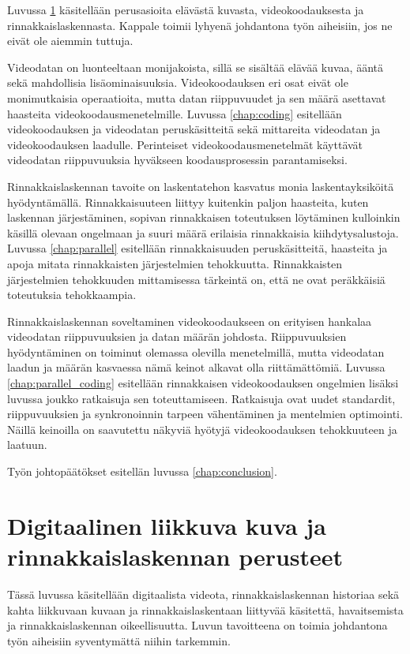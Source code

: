 Luvussa \ref{chap:intro} käsitellään perusasioita elävästä kuvasta,
videokoodauksesta ja rinnakkaislaskennasta. Kappale toimii lyhyenä johdantona
työn aiheisiin, jos ne eivät ole aiemmin tuttuja.

Videodatan on luonteeltaan monijakoista, sillä se sisältää elävää kuvaa, ääntä
sekä mahdollisia lisäominaisuuksia. Videokoodauksen eri osat eivät ole
monimutkaisia operaatioita, mutta datan riippuvuudet ja sen määrä asettavat
haasteita videokoodausmenetelmille. Luvussa \ref{chap:coding} esitellään
videokoodauksen ja videodatan peruskäsitteitä sekä mittareita
videodatan ja videokoodauksen laadulle. Perinteiset videokoodausmenetelmät
käyttävät videodatan riippuvuuksia hyväkseen koodausprosessin parantamiseksi.

Rinnakkaislaskennan tavoite on laskentatehon kasvatus monia laskentayksiköitä
hyödyntämällä. Rinnakkaisuuteen liittyy kuitenkin paljon haasteita, kuten laskennan
järjestäminen, sopivan rinnakkaisen toteutuksen löytäminen kulloinkin käsillä
olevaan ongelmaan ja suuri määrä erilaisia rinnakkaisia kiihdytysalustoja.
Luvussa \ref{chap:parallel} esitellään rinnakkaisuuden peruskäsitteitä,
haasteita ja  apoja mitata rinnakkaisten järjestelmien tehokkuutta.
Rinnakkaisten järjestelmien tehokkuuden mittamisessa tärkeintä on, että ne ovat
peräkkäisiä toteutuksia tehokkaampia.

Rinnakkaislaskennan soveltaminen videokoodaukseen on erityisen hankalaa
videodatan riippuvuuksien ja datan määrän johdosta. Riippuvuuksien hyödyntäminen
on toiminut olemassa olevilla menetelmillä,
mutta videodatan laadun ja määrän kasvaessa nämä keinot alkavat olla
riittämättömiä. Luvussa \ref{chap:parallel_coding}
esitellään rinnakkaisen videokoodauksen ongelmien lisäksi
luvussa joukko ratkaisuja sen toteuttamiseen. Ratkaisuja ovat uudet standardit, riippuvuuksien ja
synkronoinnin tarpeen vähentäminen ja mentelmien optimointi. Näillä keinoilla
on saavutettu näkyviä hyötyjä videokoodauksen tehokkuuteen ja laatuun.

Työn johtopäätökset esitellän luvussa \ref{chap:conclusion}.

\section{Digitaalinen liikkuva kuva ja rinnakkaislaskennan perusteet}
\label{chap:intro}

Tässä luvussa käsitellään digitaalista videota, rinnakkaislaskennan historiaa
sekä kahta liikkuvaan kuvaan ja rinnakkaislaskentaan liittyvää käsitettä,
havaitsemista ja rinnakkaislaskennan oikeellisuutta. Luvun tavoitteena on
toimia johdantona työn aiheisiin syventymättä niihin tarkemmin.

